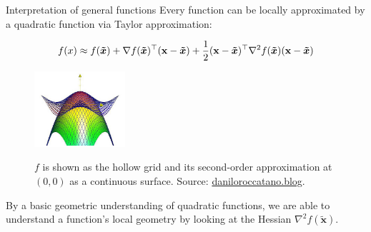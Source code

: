   \begin{vbframe}{Interpretation of general functions}
  Every function can be locally approximated by a quadratic function via Taylor approximation: 
  
  \vspace*{-0.3cm}
  
  $$
  f(x) \approx f(\bm{\tilde{x}}) + \nabla f(\bm{\tilde{x}})^\top(\mathbf{x}-\bm{\tilde{x}}) +
  \frac 12(\mathbf{x}-\bm{\tilde{x}})^\top\nabla^2 f(\bm{\tilde{x}})(\mathbf{x}-\bm{\tilde{x}})
  $$
  
  \begin{figure}
    \includegraphics[width=0.3\textwidth]{figure_man/taylor_2D_quadratic.png} \\
    \begin{footnotesize} 
    $f$ is shown as the hollow grid and its second-order approximation at $(0, 0)$ as a continuous surface. Source: \url{daniloroccatano.blog}. 
    \end{footnotesize}
  \end{figure}
  
  
  
  By a basic geometric understanding of quadratic functions, we are able to understand a function's local geometry by looking at the Hessian $\nabla^2 f(\bm{\tilde{x}})$.
  
  
  \end{vbframe}
  
  
  
  \endlecture

  
  